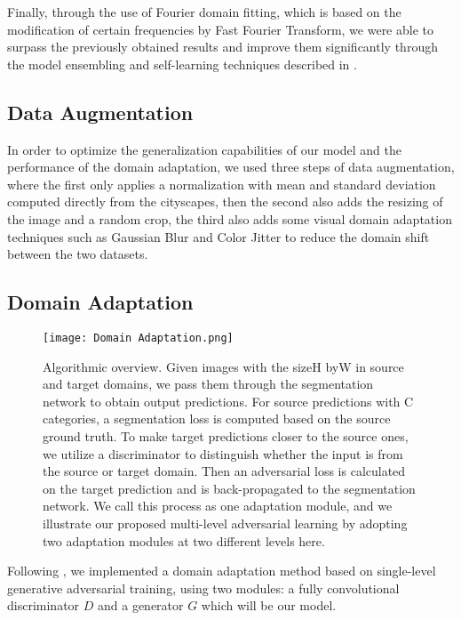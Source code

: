 \documentclass[10pt,twocolumn,letterpaper]{article}
\begin{document}
Finally, through the use of Fourier domain fitting, which is based on the modification of certain frequencies by Fast Fourier Transform, we were able to surpass the previously obtained results and improve them significantly through the model ensembling and self-learning techniques described in \cite{fda}.

\label{sec:formatting}


\subsection{Data Augmentation}
In order to optimize the generalization capabilities of our model and the performance of the domain adaptation, we used three steps of data augmentation, where the first only applies a normalization with mean and standard deviation computed directly from the cityscapes, then the second also adds the resizing of the image and a random crop, the third also adds some visual domain adaptation techniques such as Gaussian Blur and Color Jitter to reduce the domain shift between the two datasets.



\subsection{Domain Adaptation}

\begin{figure*}[t]
  \centering
   \texttt{[image: Domain Adaptation.png]}
   \caption{
   Algorithmic overview. Given images with the sizeH byW in source and target domains, we pass them through the segmentation
network to obtain output predictions. For source predictions with C categories, a segmentation loss is computed based on the source ground
truth. To make target predictions closer to the source ones, we utilize a discriminator to distinguish whether the input is from the source or
target domain. Then an adversarial loss is calculated on the target prediction and is back-propagated to the segmentation network. We call
this process as one adaptation module, and we illustrate our proposed multi-level adversarial learning by adopting two adaptation modules
at two different levels here.}
   \label{}
\end{figure*}


Following \cite{DomAd}, we implemented a domain adaptation method based on single-level generative adversarial training, using two modules: a fully convolutional discriminator $D$ and a generator $G$ which will be our model.
\end{document}
